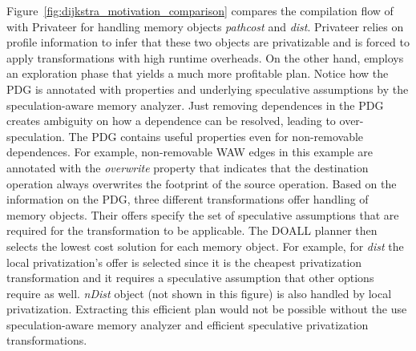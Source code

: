 Figure~\ref{fig:dijkstra_motivation_comparison} compares the
compilation flow of \name with Privateer for handling memory objects
\textit{pathcost} and \textit{dist}.
%
Privateer relies on profile information to infer that these two
objects are privatizable and is forced to apply transformations with
high runtime overheads.
%
On the other hand, \name employs an exploration phase that yields a
much more profitable plan.
Notice how the PDG is annotated with properties and underlying
speculative assumptions by the speculation-aware memory analyzer.
%
Just removing dependences in the PDG creates ambiguity on how a
dependence can be resolved, leading to over-speculation. The PDG
contains useful properties even for non-removable dependences. For
example, non-removable WAW edges in this example are annotated with
the \textit{overwrite} property that indicates that the destination
operation always overwrites the footprint of the source operation.
%
Based on the information on the PDG, three different transformations
offer handling of memory objects. Their offers specify the set of
speculative assumptions that are required for the transformation to be
applicable.
%
%
The DOALL planner then selects the lowest cost solution for each
memory object. For example, for \textit{dist} the local
privatization's offer is selected since it is the cheapest
privatization transformation and it requires a speculative assumption
that other options require as well. \textit{nDist} object (not shown
in this figure) is also handled by local privatization.
%
Extracting this efficient plan would not be possible without the use
speculation-aware memory analyzer and efficient speculative
privatization transformations.




